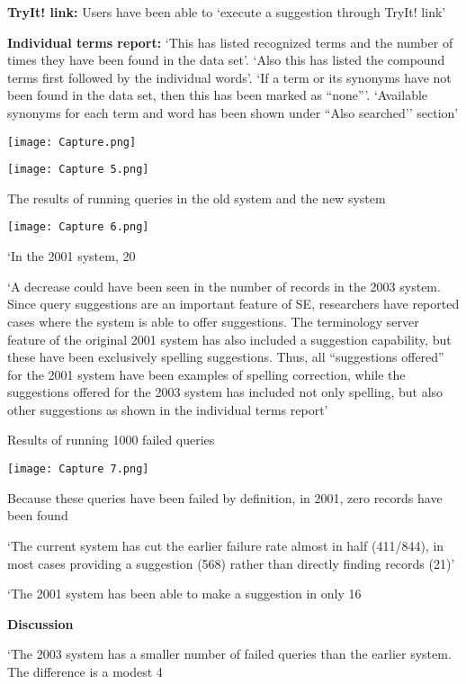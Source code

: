 \documentclass[]{article}
\begin{document}
{{\textbf{TryIt! link:} Users have been able to ‘execute a suggestion through TryIt! link’

\textbf{Individual terms report:} ‘This has listed recognized terms and the number of times they have been found in the data set’. ‘Also this has listed the compound terms first followed by the individual words’. ‘If a term or its synonyms have not been found in the data set, then this has been marked as “none”’. ‘Available synonyms for each term and word has been shown under “Also searched’’ section’

\texttt{[image: Capture.png]}

\texttt{[image: Capture 5.png]}   

The results of running queries in the old system and the new system

\texttt{[image: Capture 6.png]}   

‘In the 2001 system, 20%

‘A decrease could have been seen in the number of records in the 2003 system. Since query suggestions are an important feature of SE, researchers have reported cases where the system is able to offer suggestions. The terminology server feature of the original 2001 system has also included a suggestion capability, but these have been exclusively spelling suggestions. Thus, all “suggestions offered” for the 2001 system have been examples of spelling correction, while the suggestions offered for the 2003 system has included not only spelling, but also other suggestions as shown in the individual terms report’

Results of running 1000 failed queries

\texttt{[image: Capture 7.png]} 

Because these queries have been failed by definition, in 2001, zero records have been found

‘The current system has cut the earlier failure rate almost in half (411/844), in most cases providing a suggestion (568) rather than directly finding records (21)’

‘The 2001 system has been able to make a suggestion in only 16%

\textbf{Discussion}

‘The 2003 system has a smaller number of failed queries than the earlier system. The difference is a modest 4%

}}
\end{document}
